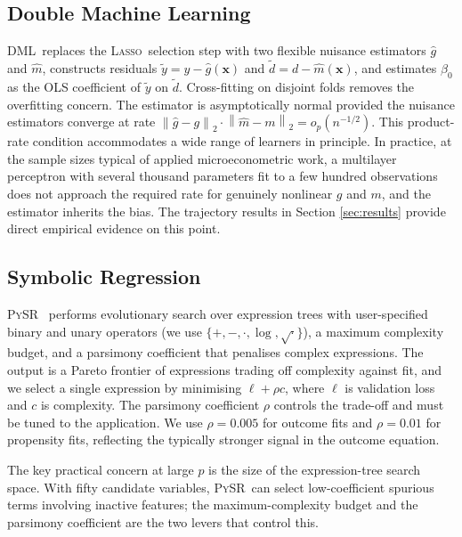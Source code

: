 \documentclass[11pt, a4paper]{article}
\theoremstyle{plain}
\theoremstyle{definition}
\theoremstyle{remark}
\newcommand{\lasso}{\textsc{Lasso}}
\newcommand{\dml}{\textsc{DML}}
\newcommand{\pysr}{\textsc{PySR}}
\newcommand{\norm}[1]{\left\lVert #1 \right\rVert}
\begin{document}
\subsection{Double Machine Learning}

\dml\ replaces the \lasso\ selection step with two flexible
nuisance estimators $\hat g$ and $\hat m$, constructs residuals
$\tilde y = y - \hat g(\bm{x})$ and $\tilde d = d - \hat
m(\bm{x})$, and estimates $\beta_0$ as the OLS coefficient of
$\tilde y$ on $\tilde d$. Cross-fitting on disjoint folds removes
the overfitting concern. The estimator is asymptotically normal
provided the nuisance estimators converge at rate $\norm{\hat g -
g}_2 \cdot \norm{\hat m - m}_2 = o_p(n^{-1/2})$. This product-%
rate condition accommodates a wide range of learners in
principle. In practice, at the sample sizes typical of applied
microeconometric work, a multilayer perceptron with several
thousand parameters fit to a few hundred observations does not
approach the required rate for genuinely nonlinear $g$ and $m$,
and the estimator inherits the bias. The trajectory results in
Section \ref{sec:results} provide direct empirical evidence on
this point.

\subsection{Symbolic Regression}

\pysr\ \citep{cranmer2023pysr} performs evolutionary search over
expression trees with user-specified binary and unary operators
(we use $\{+, -, \cdot, \log, \sqrt{\cdot}\}$), a maximum
complexity budget, and a parsimony coefficient that penalises
complex expressions. The output is a Pareto frontier of
expressions trading off complexity against fit, and we select a
single expression by minimising $\ell + \rho c$, where $\ell$ is
validation loss and $c$ is complexity. The parsimony coefficient
$\rho$ controls the trade-off and must be tuned to the
application. We use $\rho = 0.005$ for outcome fits and $\rho =
0.01$ for propensity fits, reflecting the typically stronger
signal in the outcome equation.

The key practical concern at large $p$ is the size of the
expression-tree search space. With fifty candidate variables,
\pysr\ can select low-coefficient spurious terms involving
inactive features; the maximum-complexity budget and the
parsimony coefficient are the two levers that control this.

\end{document}
